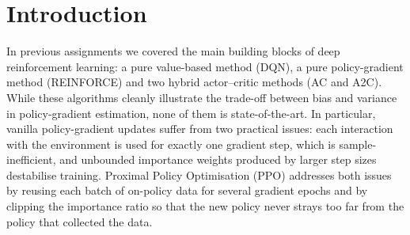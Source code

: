 \documentclass{article}
\theoremstyle{plain}
\theoremstyle{definition}
\theoremstyle{remark}
\begin{document}

\printAffiliationsAndNotice{\icmlEqualContribution}

\begin{abstract}
This report studies Proximal Policy Optimisation (PPO), a state-of-the-art on-policy actor-critic algorithm, applied to the CartPole environment. We motivate and derive the \textbf{clipped surrogate policy} loss and the value loss, and we relate them to the vanilla policy gradient used in \textbf{REINFORCE}, \textbf{AC} and \textbf{A2C}. We implement the \textbf{PPO-clipped algorithm} strengthened with \textbf{Generalised Advantage Estimation (GAE)}, as well, as our advantage estimator. Then the resulting learning curves are compared against the baseline given in Assignment 2, DQN, AC and A2C and we observe how PPO with GAE attains the CartPole optimum performs across repetitions of the methods studied.
\end{abstract}

\section{Introduction}\label{sec:introduction}

In previous assignments we covered the main building blocks of deep reinforcement learning: a pure value-based method (DQN), a pure policy-gradient method (REINFORCE) and two hybrid actor--critic methods (AC and A2C). While these algorithms cleanly illustrate the trade-off between bias and variance in policy-gradient estimation, none of them is state-of-the-art. In particular, vanilla policy-gradient updates suffer from two practical issues: each interaction with the environment is used for exactly one gradient step, which is sample-inefficient, and unbounded importance weights produced by larger step sizes destabilise training. Proximal Policy Optimisation (PPO) \cite{schulman2017ppo} addresses both issues by reusing each batch of on-policy data for several gradient epochs and by clipping the importance ratio so that the new policy never strays too far from the policy that collected the data.
\end{document}
